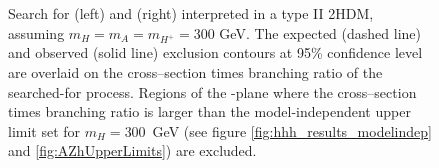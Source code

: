\begin{figure}[h!]
\begin{center}
\caption{Search for \Htohhtobbtautau (left) and \AtoZhtolltautau (right) interpreted in a type II 
2HDM, assuming $m_{H} = m_{A} = m_{H^{+}} = 300$ GeV. The expected (dashed line)
and observed (solid line) exclusion contours at 95\% confidence level are overlaid
on the cross--section times branching ratio of the searched-for process.
Regions of the \cosba-\tanb plane where the cross--section times branching
ratio is larger than the model-independent upper limit set for $m_{H} = 300 $~GeV 
(see figure \ref{fig:hhh_results_modelindep} and \ref{fig:AZhUpperLimits}) are excluded.}
\label{fig:HhhandAZh2HDMOverlaid}
\end{center}
\end{figure}


